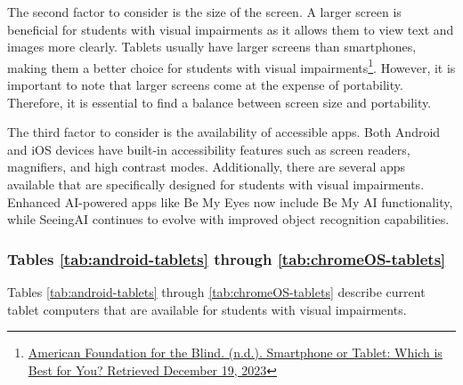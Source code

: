 The second factor to consider is the size of the screen. A larger screen is beneficial for students with visual impairments as it allows them to view text and images more clearly. Tablets usually have larger screens than smartphones, making them a better choice for students with visual impairments\footnote{\raggedright \href{https://www.afb.org/blindness-and-low-vision/using-technology/cell-phones-tablets-mobile/smartphone-or-tablet-which}{American Foundation for the Blind. (n.d.). Smartphone or Tablet: Which is Best for You? Retrieved December 19, 2023}}. However, it is important to note that larger screens come at the expense of portability. Therefore, it is essential to find a balance between screen size and portability.

The third factor to consider is the availability of accessible apps. Both Android and iOS devices have built-in accessibility features such as screen readers, magnifiers, and high contrast modes.
 \cite{AAOApps}
 \cite{AFBiOS}
Additionally, there are several apps available that are specifically designed for students with visual impairments. Enhanced AI-powered apps like Be My Eyes now include Be My AI functionality, while SeeingAI continues to evolve with improved object recognition capabilities.
 \cite{AAOTechnologyTools}

\subsubsection{Tables \ref{tab:android-tablets} through \ref{tab:chromeOS-tablets}}
Tables \ref{tab:android-tablets} through \ref{tab:chromeOS-tablets} describe current tablet computers that are available for students with visual impairments.

